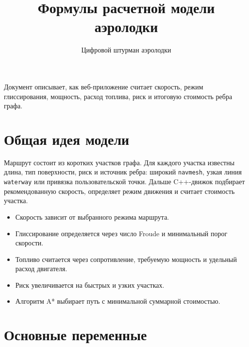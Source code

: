 \documentclass[12pt,a4paper]{article}
\title{Формулы расчетной модели аэролодки}
\author{Цифровой штурман аэролодки}
\date{}
\newcommand{\code}[1]{\texttt{#1}}
\begin{document}
\maketitle

\noindent
Документ описывает, как веб-приложение считает скорость, режим глиссирования,
мощность, расход топлива, риск и итоговую стоимость ребра графа.

\section{Общая идея модели}

Маршрут состоит из коротких участков графа. Для каждого участка известны длина,
тип поверхности, риск и источник ребра: широкий \code{navmesh}, узкая линия
\code{waterway} или привязка пользовательской точки. Дальше C++-движок
подбирает рекомендованную скорость, определяет режим движения и считает
стоимость участка.

\begin{itemize}
  \item Скорость зависит от выбранного режима маршрута.
  \item Глиссирование определяется через число Froude и минимальный порог скорости.
  \item Топливо считается через сопротивление, требуемую мощность и удельный расход двигателя.
  \item Риск увеличивается на быстрых и узких участках.
  \item Алгоритм A* выбирает путь с минимальной суммарной стоимостью.
\end{itemize}

\section{Основные переменные}
\end{document}

